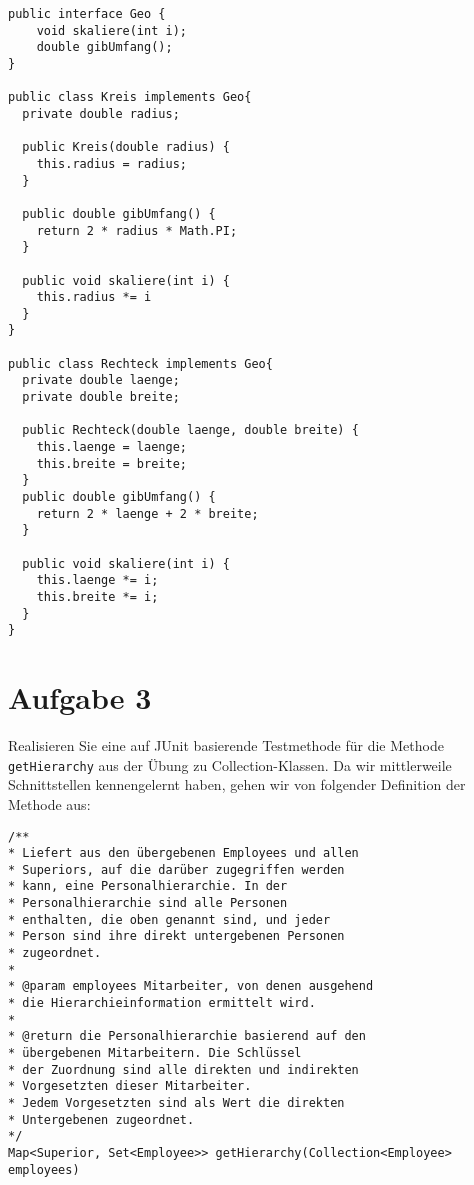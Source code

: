 \begin{lstlisting}
public interface Geo {
    void skaliere(int i);
    double gibUmfang();
}

public class Kreis implements Geo{
  private double radius;

  public Kreis(double radius) {
    this.radius = radius;
  }

  public double gibUmfang() {
    return 2 * radius * Math.PI;
  }

  public void skaliere(int i) {
    this.radius *= i
  } 
}

public class Rechteck implements Geo{
  private double laenge;
  private double breite;

  public Rechteck(double laenge, double breite) {
    this.laenge = laenge;
    this.breite = breite;
  }
  public double gibUmfang() {
    return 2 * laenge + 2 * breite;
  }

  public void skaliere(int i) {
    this.laenge *= i;
    this.breite *= i;
  }
}
\end{lstlisting}

\section{Aufgabe 3}
Realisieren Sie eine auf JUnit basierende Testmethode für die Methode
\lstinline{getHierarchy} aus der Übung zu Collection-Klassen. Da wir mittlerweile
Schnittstellen kennengelernt haben, gehen wir von folgender Definition der
Methode aus:

\begin{lstlisting}
/**
* Liefert aus den übergebenen Employees und allen 
* Superiors, auf die darüber zugegriffen werden 
* kann, eine Personalhierarchie. In der 
* Personalhierarchie sind alle Personen 
* enthalten, die oben genannt sind, und jeder 
* Person sind ihre direkt untergebenen Personen  
* zugeordnet.
*
* @param employees Mitarbeiter, von denen ausgehend 
* die Hierarchieinformation ermittelt wird.
*
* @return die Personalhierarchie basierend auf den 
* übergebenen Mitarbeitern. Die Schlüssel
* der Zuordnung sind alle direkten und indirekten 
* Vorgesetzten dieser Mitarbeiter.
* Jedem Vorgesetzten sind als Wert die direkten 
* Untergebenen zugeordnet.
*/
Map<Superior, Set<Employee>> getHierarchy(Collection<Employee> employees)
\end{lstlisting}

\pagebreak

